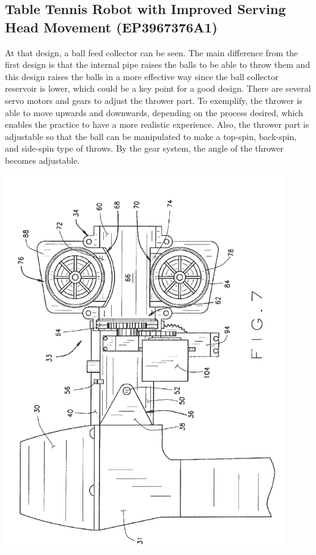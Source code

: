 \documentclass[12pt]{report}
\begin{document}
\subsection{ Table Tennis Robot with Improved Serving Head Movement
 (EP3967376A1) \cite{Thoman2022}}

\begin{minipage}{0.7\textwidth}  %
     At that design, a ball feed collector can be seen. The main difference from the first design is that the internal pipe raises the balls to be able to throw them and this design raises the balls in a more effective way since the ball collector reservoir is lower, which could be a key point for a good design. There are several servo motors and gears to adjust the thrower part. To exemplify, the thrower is able to move upwards and downwards, depending on the process desired, which enables the practice to have a more realistic experience. Also, the thrower part is adjustable so that the ball can be manipulated to make a top-spin, back-spin, and side-spin type of throws. By the gear system, the angle of the thrower becomes adjustable. 
\end{minipage}%
\hfill
\begin{minipage}{0.28\textwidth}  %
    \centering
    \includegraphics[width=0.9\textwidth]{figures/patent3-3.png}
    \label{fig:pt3-1}
\end{minipage}
\end{document}

